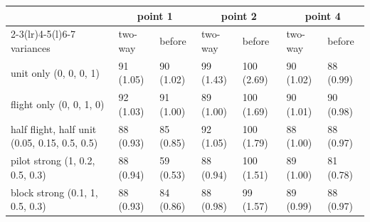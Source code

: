 \begin{tabular}{@{}l l l l l l l@{}}
\toprule
 & \multicolumn{2}{c}{point 1} & \multicolumn{2}{c}{point 2} & \multicolumn{2}{c}{point 4} \\
\cmidrule(lr){2-3}\cmidrule(lr){4-5}\cmidrule(l){6-7}
variances & two-way & before & two-way & before & two-way & before \\
\midrule
unit only (0, 0, 0, 1) & 91 (1.05) & 90 (1.02) & 99 (1.43) & 100 (2.69) & 90 (1.02) & 88 (0.99) \\
flight only (0, 0, 1, 0) & 92 (1.03) & 91 (1.00) & 89 (1.00) & 100 (1.69) & 90 (1.01) & 90 (0.98) \\
half flight, half unit (0.05, 0.15, 0.5, 0.5) & 88 (0.93) & 85 (0.85) & 92 (1.05) & 100 (1.79) & 88 (1.00) & 88 (0.97) \\
pilot strong (1, 0.2, 0.5, 0.3) & 88 (0.94) & 59 (0.53) & 88 (0.94) & 100 (1.51) & 89 (1.00) & 81 (0.78) \\
block strong (0.1, 1, 0.5, 0.3) & 88 (0.93) & 84 (0.86) & 88 (0.98) & 99 (1.57) & 89 (0.99) & 88 (0.97) \\
\bottomrule
\end{tabular}
